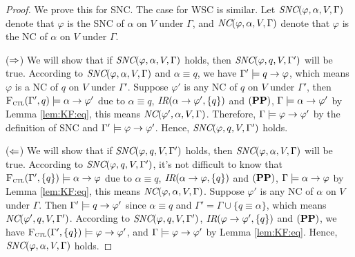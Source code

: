 \documentclass{article}
\begin{document}
\begin{proof}
    We prove this for SNC. The case for WSC is similar.
    Let $\emph{SNC}(\varphi,\alpha,V,\Gamma)$ denote that $\varphi$ is the SNC of $\alpha$ on $V$ under $\Gamma$, and  $\emph{NC}(\varphi,\alpha,V,\Gamma)$ denote that $\varphi$ is the NC of $\alpha$ on $V$ under $\Gamma$.

    ($\Rightarrow$) We will show that if $\emph{SNC}(\varphi,\alpha,V,\Gamma)$ holds, then $\emph{SNC}(\varphi,q,V,\Gamma')$ will be true. According to $\emph{SNC}(\varphi,\alpha,V,\Gamma)$ and $\alpha\equiv q$, we have $\Gamma' \models q\rightarrow \varphi$, which means $\varphi$ is a NC of $q$ on $V$ under $\Gamma'$. Suppose $\varphi'$ is any NC of $q$ on $V$ under $\Gamma'$, then ${\textsc{F}_{\textsc{ctl}}}(\Gamma',q)\models \alpha \rightarrow \varphi'$ due to $\alpha\equiv q$, $\emph{IR}(\alpha \rightarrow \varphi', \{q\})$ and $(\textbf{PP})$, \ie $\Gamma \models \alpha \rightarrow \varphi'$ by Lemma \ref{lem:KF:eq}, this means $\emph{NC}(\varphi',\alpha,V,\Gamma)$. Therefore, $\Gamma \models \varphi \rightarrow \varphi'$ by the definition of SNC and $\Gamma' \models \varphi \rightarrow \varphi'$. Hence, $\emph{SNC}(\varphi,q,V,\Gamma')$ holds.

    ($\Leftarrow$) We will show that if $\emph{SNC}(\varphi,q,V,\Gamma')$ holds, then $\emph{SNC}(\varphi,\alpha,V,\Gamma)$ will be true. According to $\emph{SNC}(\varphi,q,V,\Gamma')$, it's not difficult to know that ${\textsc{F}_{\textsc{ctl}}}(\Gamma', \{q\})\models \alpha \rightarrow \varphi$ due to $\alpha\equiv q$, $\emph{IR}(\alpha \rightarrow \varphi, \{q\})$ and $(\textbf{PP})$, \ie $\Gamma \models \alpha \rightarrow \varphi$ by Lemma \ref{lem:KF:eq}, this means $\emph{NC}(\varphi,\alpha,V,\Gamma)$. Suppose $\varphi'$ is any NC of $\alpha$ on $V$ under $\Gamma$. Then $\Gamma' \models q \rightarrow \varphi'$ since $\alpha\equiv q$ and $\Gamma'=\Gamma \cup \{q\equiv \alpha\}$, which means $\emph{NC}(\varphi',q,V,\Gamma')$. According to $\emph{SNC}(\varphi,q,V,\Gamma')$, $\emph{IR}(\varphi \rightarrow \varphi', \{q\})$ and $(\textbf{PP})$, we have
    ${\textsc{F}_{\textsc{ctl}}}(\Gamma', \{q\})\models \varphi \rightarrow \varphi'$, and $\Gamma \models \varphi \rightarrow \varphi'$ by Lemma \ref{lem:KF:eq}. Hence, $\emph{SNC}(\varphi,\alpha,V, \Gamma)$ holds.
    \end{proof}
\end{document}
